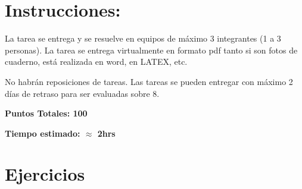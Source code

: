 \section*{Instrucciones:}

La tarea se entrega y se resuelve en equipos de máximo 3 integrantes (1 a 3 personas). La tarea se entrega virtualmente en formato pdf tanto si son fotos de cuaderno, está realizada en word, en LATEX, etc.

No habrán reposiciones de tareas. Las tareas se pueden entregar con máximo 2 días de retraso para ser evaluadas sobre 8.

\textbf{Puntos Totales: 100}

\textbf{Tiempo estimado: $\approx$ 2hrs}

\section*{Ejercicios}


